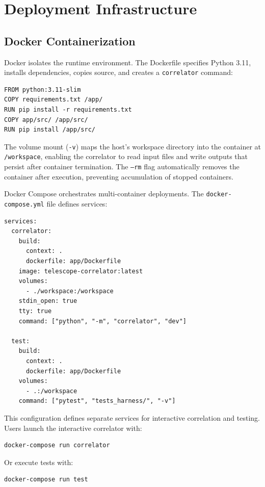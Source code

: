 \section{Deployment Infrastructure}

\subsection{Docker Containerization}

Docker isolates the runtime environment. The Dockerfile specifies Python 3.11, installs dependencies, copies source, and creates a \texttt{correlator} command:

\begin{verbatim}
FROM python:3.11-slim
COPY requirements.txt /app/
RUN pip install -r requirements.txt
COPY app/src/ /app/src/
RUN pip install /app/src/
\end{verbatim}

The volume mount (\texttt{-v}) maps the host's workspace directory into the container at \texttt{/workspace}, enabling the correlator to read input files and write outputs that persist after container termination. The \texttt{--rm} flag automatically removes the container after execution, preventing accumulation of stopped containers.

Docker Compose orchestrates multi-container deployments. The \texttt{docker-compose.yml} file defines services:

\begin{verbatim}
services:
  correlator:
    build:
      context: .
      dockerfile: app/Dockerfile
    image: telescope-correlator:latest
    volumes:
      - ./workspace:/workspace
    stdin_open: true
    tty: true
    command: ["python", "-m", "correlator", "dev"]

  test:
    build:
      context: .
      dockerfile: app/Dockerfile
    volumes:
      - .:/workspace
    command: ["pytest", "tests_harness/", "-v"]
\end{verbatim}

This configuration defines separate services for interactive correlation and testing. Users launch the interactive correlator with:

\begin{verbatim}
docker-compose run correlator
\end{verbatim}

Or execute tests with:

\begin{verbatim}
docker-compose run test
\end{verbatim}

